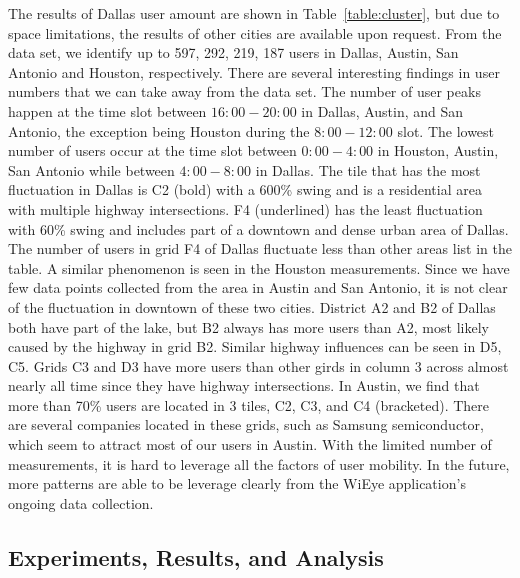 %
%
%
%




The results of Dallas user amount are shown in Table~\ref{table:cluster}, but due to space limitations, the results of other cities are available upon request.
From the data set, we identify up to 597, 292, 219, 187 users in Dallas, Austin, San Antonio and Houston, respectively.
There are several interesting findings in user numbers that we can take away from the data set.
The number of user peaks happen at the time slot between $16:00-20:00$ in Dallas, Austin, and San Antonio, the exception being Houston during the $8:00-12:00$ slot.
The lowest number of users occur at the time slot between $0:00-4:00$ in Houston, Austin, San Antonio while between $4:00-8:00$ in Dallas.
The tile that has the most fluctuation in Dallas is C2 (bold) with a 600\% swing and is a residential area with multiple highway intersections.
F4 (underlined) has the least fluctuation with 60\% swing and includes part of a downtown and dense urban area of Dallas. 
The number of users in grid F4 of Dallas fluctuate less than other areas list in the table.
A similar phenomenon is seen in the Houston measurements. 
Since we have few data points collected from the area in Austin and San Antonio, it is not clear of the fluctuation in downtown of these two cities.
District A2 and B2 of Dallas both have part of the lake, but B2 always has more users than A2, most likely caused by the highway in grid B2. 
Similar highway influences can be seen in D5, C5. 
Grids C3 and D3 have more users than other girds in column 3 across almost nearly all time since they have highway intersections.
In Austin, we find that more than 70\% users are located in 3 tiles, C2, C3, and C4 (bracketed). 
There are several companies located in these grids, such as Samsung semiconductor, which seem to attract most of our users in Austin.
With the limited number of measurements, it is hard to leverage all the factors of user mobility. 
In the future, more patterns are able to be leverage clearly from the WiEye application's ongoing data collection.


\subsection{Experiments, Results, and Analysis}
\label{subsec:experimentsetup}


